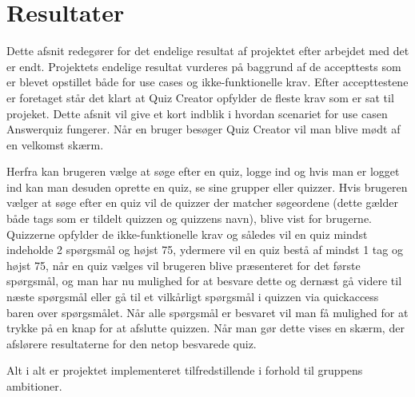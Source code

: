 \section{Resultater}
Dette afsnit redegører for det endelige resultat af projektet efter arbejdet med det er endt. Projektets endelige resultat vurderes på baggrund af de accepttests som er blevet opstillet både for use cases og ikke-funktionelle krav. Efter accepttestene er foretaget står det klart at Quiz Creator opfylder de fleste krav som er sat til projeket. Dette afsnit vil give et kort indblik i hvordan scenariet for use casen Answerquiz fungerer. Når en bruger besøger Quiz Creator vil man blive mødt af en velkomst skærm.


Herfra kan brugeren vælge at søge efter en quiz, logge ind og hvis man er logget ind kan man desuden oprette en quiz, se sine grupper eller quizzer. Hvis brugeren vælger at søge efter en quiz vil de quizzer der matcher søgeordene (dette gælder både tags som er tildelt quizzen og quizzens navn), blive vist for brugerne. Quizzerne opfylder de ikke-funktionelle krav og således vil en quiz mindst indeholde 2 spørgsmål og højst 75, ydermere vil en quiz bestå af mindst 1 tag og højst 75, når en quiz vælges vil brugeren blive præsenteret for det første spørgsmål, og man har nu mulighed for at besvare dette og dernæst gå videre til næste spørgsmål eller gå til et vilkårligt spørgsmål i quizzen via quickaccess baren over spørgsmålet. Når alle spørgsmål er besvaret vil man få mulighed for at trykke på en knap for at afslutte quizzen. Når man gør dette vises en skærm, der afslørere resultaterne for den netop besvarede quiz.

Alt i alt er projektet implementeret tilfredstillende i forhold til gruppens ambitioner. 


